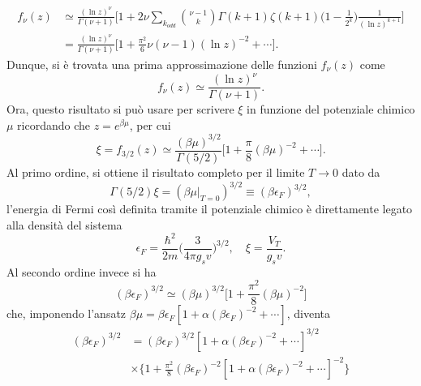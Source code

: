 \begin{caso}
\begin{equation}
        \begin{split}
            f_\nu(z) & \simeq \frac{(\ln{z})^\nu}{\Gamma(\nu + 1)}\bigg[1 + 2\nu\sum_{k_{odd}}\binom{\nu-1}{k}\Gamma(k+1)\zeta(k+1)\bigg(1 - \frac{1}{2^k}\bigg)\frac{1}{(\ln{z})^{k+1}}\bigg] \\
            &= \frac{(\ln{z})^\nu}{\Gamma(\nu + 1)}\bigg[1 + \frac{\pi^2}{6}\nu(\nu - 1)(\ln{z})^{-2} + \cdots\bigg].
        \end{split}
    \end{equation}
    Dunque, si è trovata una prima approssimazione delle funzioni $f_\nu(z)$ come 
    \begin{equation}
        f_\nu(z) \simeq \frac{(\ln{z})^\nu}{\Gamma(\nu + 1)}.
    \end{equation}
    Ora, questo risultato si può usare per scrivere $\xi$ in funzione del potenziale chimico $\mu$ ricordando che $z = e^{\beta\mu}$, per cui 
    \begin{equation}
        \xi = f_{3/2}(z) \simeq  \frac{(\beta\mu)^{3/2}}{\Gamma(5/2)}\bigg[1 + \frac{\pi}{8}(\beta\mu)^{-2} + \cdots \bigg].
    \end{equation}
    Al primo ordine, si ottiene il risultato completo per il limite $T \to 0$ dato da
    \begin{equation}
        \Gamma(5/2)\xi  =(\beta\mu|_{T=0})^{3/2} \equiv (\beta\epsilon_F)^{3/2},
    \end{equation}
    l'energia di Fermi così definita tramite il potenziale chimico è direttamente legato alla densità del sistema
    \begin{equation}
        \epsilon_F = \frac{\hbar^2}{2m}\bigg(\frac{3}{4\pi g_sv}\bigg)^{3/2},\quad \xi = \frac{V_T}{g_sv}.
    \end{equation}
    Al secondo ordine invece si ha
    \begin{equation}
        (\beta\epsilon_F)^{3/2} \simeq (\beta\mu)^{3/2}\bigg[1 + \frac{\pi^2}{8}(\beta\mu)^{-2}\bigg]
    \end{equation}
    che, imponendo l'ansatz $\beta\mu = \beta\epsilon_F[1 + \alpha(\beta\epsilon_F)^{-2} + \cdots]$, diventa
    \begin{equation}
        \begin{split}
            (\beta\epsilon_F)^{3/2}  &= (\beta\epsilon_F)^{3/2} [1 + \alpha(\beta\epsilon_F)^{-2} + \cdots]^{3/2} \\
            &\times\bigg\{1 + \frac{\pi^2}{8}(\beta\epsilon_F)^{-2}[1 + \alpha(\beta\epsilon_F)^{-2} + \cdots]^{-2}\bigg\} \\

\end{split}
\end{equation}
\end{caso}
